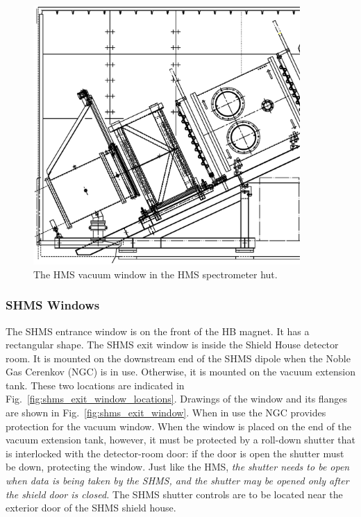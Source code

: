 {\begin{figure}
\begin{center}
\includegraphics[width=4in]{figHMShut}
\caption{The HMS vacuum window in the HMS spectrometer hut. 
\label{fig:hms_window2}}
\end{center}
\end{figure}

\subsubsection{SHMS Windows}

The SHMS entrance window is on the front of the HB magnet. It has a rectangular shape.
The SHMS exit window is inside the Shield House detector room. It is mounted on the 
downstream end of the SHMS dipole when the Noble Gas Cerenkov (NGC)
is in use. Otherwise, it is mounted on the vacuum extension tank.  These two locations
are indicated in Fig.~\ref{fig:shms_exit_window_locations}.  Drawings of
the window and its flanges are shown in Fig.~\ref{fig:shms_exit_window}. When in use
the NGC provides protection for the vacuum window. When the window is placed on
the end of the vacuum extension tank, however, it must be protected by a roll-down
shutter that is interlocked with the detector-room door: if the door is open the shutter
must be down, protecting the window. Just like the HMS, \emph{the shutter needs to be
open when data is being taken by the SHMS, and the shutter may be opened only
after the shield door is closed.} The SHMS shutter controls are to be located near the 
exterior door of the SHMS shield house.

}
